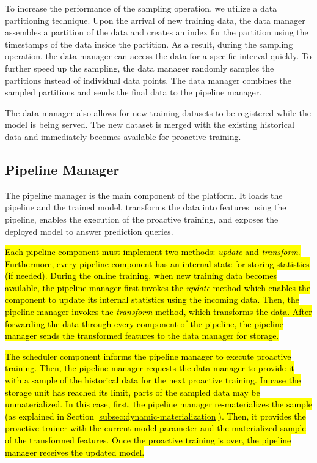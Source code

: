 To increase the performance of the sampling operation, we utilize a data partitioning technique.
Upon the arrival of new training data, the data manager assembles a partition of the data and creates an index for the partition using the timestamps of the data inside the partition.
As a result, during the sampling operation, the data manager can access the data for a specific interval quickly.
To further speed up the sampling, the data manager randomly samples the partitions instead of individual data points.
The data manager combines the sampled partitions and sends the final data to the pipeline manager.

The data manager also allows for new training datasets to be registered while the model is being served.
The new dataset is merged with the existing historical data and immediately becomes available for proactive training.

\subsection{Pipeline Manager} \label{pipeline-manager} 
The pipeline manager is the main component of the platform.
It loads the pipeline and the trained model, transforms the data into features using the pipeline, enables the execution of the proactive training, and exposes the deployed model to answer prediction queries.

\hl{Each pipeline component must implement two methods: \textit{update} and \textit{transform}.
Furthermore, every pipeline component has an internal state for storing statistics (if needed).
During the online training, when new training data becomes available, the pipeline manager first invokes the \textit{update} method which enables the component to update its internal statistics using the incoming data.
Then, the pipeline manager invokes the \textit{transform} method, which transforms the data.
After forwarding the data through every component of the pipeline, the pipeline manager sends the transformed features to the data manager for storage.}

\hl{The scheduler component informs the pipeline manager to execute proactive training.
Then, the pipeline manager requests the data manager to provide it with a sample of the historical data for the next proactive training.
In case the storage unit has reached its limit, parts of the sampled data may be unmaterialized.
In this case, first, the pipeline manager re-materializes the sample (as explained in Section \ref{subsec:dynamic-materialization}).
Then, it provides the proactive trainer with the current model parameter and the materialized sample of the transformed features.
Once the proactive training is over, the pipeline manager receives the updated model.}


